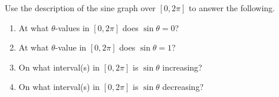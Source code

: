 \documentclass[10pt]{article}
\begin{document}
\vspace{0.1in}

\begin{practicebox}
Use the description of the sine graph over $[0,2\pi]$ to answer the following.

\begin{enumerate}[leftmargin=1.5em, itemsep=10pt]
    \item At what $\theta$-values in $[0,2\pi]$ does $\sin\theta=0$?

          \blank{8cm}

    \item At what $\theta$-value in $[0,2\pi]$ does $\sin\theta=1$?

          \blank{6cm}

    \item On what interval(s) in $[0,2\pi]$ is $\sin\theta$ increasing?

          \blank{8cm}

    \item On what interval(s) in $[0,2\pi]$ is $\sin\theta$ decreasing?

          \blank{8cm}
\end{enumerate}
\end{practicebox}
\end{document}
